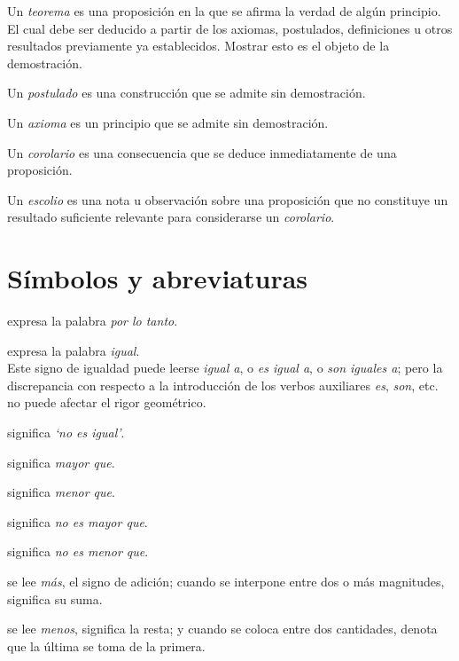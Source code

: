 \documentclass[booklanguage=english]{byrnebook}
\begin{document}
Un \emph{teorema} es una proposición en la que se afirma la verdad de algún principio. El cual debe ser deducido a partir de los axiomas, postulados, definiciones u otros resultados previamente ya establecidos. Mostrar esto es el objeto de la demostración.

Un \emph{postulado} es una construcción que se admite sin demostración.

Un \emph{axioma} es un principio que se admite sin demostración.

Un \emph{corolario} es una consecuencia que se deduce inmediatamente de una proposición.

Un \emph{escolio} es una nota u observación sobre una proposición que no constituye un resultado suficiente relevante para considerarse un \emph{corolario}.


\pagebreak

\chapter*{Símbolos y abreviaturas}\label{sec:simb}

\symb{$\therefore$}
expresa la palabra \emph{por lo tanto}.


\symb{$=$}
 expresa la palabra \emph{igual}. \\ Este signo de igualdad puede leerse \emph{igual a}, o \emph{es igual a}, o \emph{son iguales a}; pero la discrepancia con respecto a la introducción de los verbos auxiliares \emph{es}, \emph{son}, etc. no puede afectar el rigor geométrico.

\symb{$\neq$}
 significa \emph{‘no es igual’}.

\symb{$>$}
 significa \emph{mayor que}.

\symb{$<$}
 significa \emph{menor que}.

\symb{$\ngtr$}
 significa \emph{no es mayor que}.

\symb{$\nless$}
 significa \emph{no es menor que}.

\symb{$+$}
 se lee \emph{más}, el signo de adición; cuando se interpone entre dos o más magnitudes, significa su suma.

\symb{$-$}
 se lee \emph{menos}, significa la resta; y cuando se coloca entre dos cantidades, denota que la última se toma de la primera.
\end{document}
